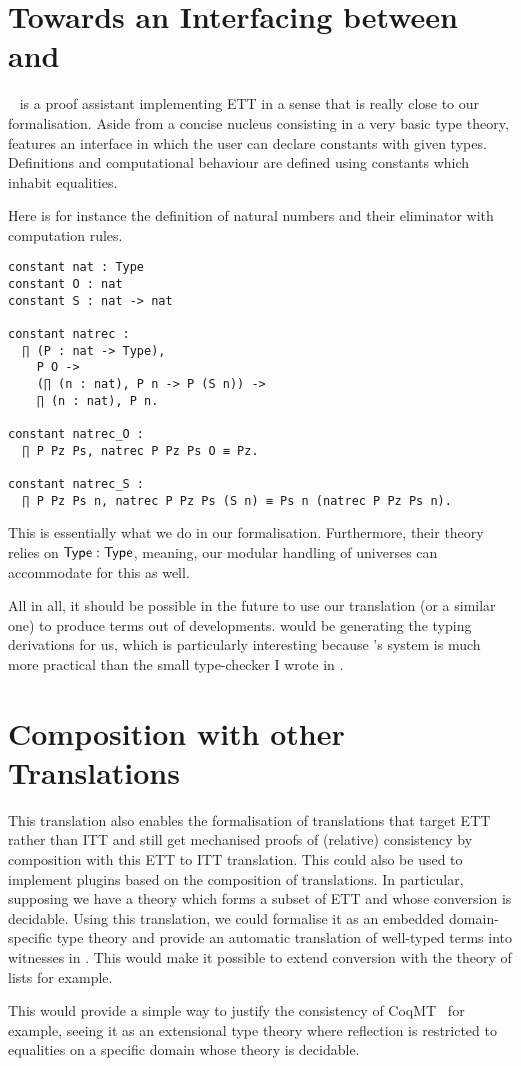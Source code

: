\section{Towards an Interfacing between \Andromeda and \Coq}

\Andromeda~ is a proof assistant implementing \acrshort{ETT}
in a sense that is really close to our formalisation. Aside from a concise
nucleus consisting in a very basic type theory, \Andromeda features an interface
in which the user can declare constants with given types. Definitions and
computational behaviour are defined using constants which inhabit equalities.

Here is for instance the definition of natural numbers and their eliminator
with computation rules.
\begin{verbatim}
constant nat : Type
constant O : nat
constant S : nat -> nat

constant natrec :
  ∏ (P : nat -> Type),
    P O ->
    (∏ (n : nat), P n -> P (S n)) ->
    ∏ (n : nat), P n.

constant natrec_O :
  ∏ P Pz Ps, natrec P Pz Ps O ≡ Pz.

constant natrec_S :
  ∏ P Pz Ps n, natrec P Pz Ps (S n) ≡ Ps n (natrec P Pz Ps n).
\end{verbatim}
This is essentially what we do in our formalisation.
Furthermore, their theory relies on $\mathsf{Type} : \mathsf{Type}$, meaning, our modular
handling of universes can accommodate for this as well.

All in all, it should be possible in the future to use our translation
(or a similar one) to produce \Coq terms out of \Andromeda developments.
\Andromeda would be generating the typing derivations for us, which is
particularly interesting because \Andromeda's system is much more practical
than the small type-checker I wrote in \Coq.

\section{Composition with other Translations}

This translation also enables the formalisation of translations that
target \acrshort{ETT} rather than \acrshort{ITT} and still get mechanised proofs
of (relative) consistency by composition with this \acrshort{ETT} to
\acrshort{ITT} translation.
This could also be used to implement plugins based on the composition of
translations. In particular, supposing we have a theory which forms a
subset of \acrshort{ETT} and whose conversion is decidable. Using this
translation, we could formalise it as an embedded domain-specific type theory
and provide an automatic translation of well-typed terms into witnesses in
\Coq. This would make it possible to extend conversion with the theory
of lists for example.

This would provide a simple way to justify the consistency of
\acrshort{CoqMT}~ for example, seeing it
as an extensional type theory where reflection is restricted to equalities on a
specific domain whose theory is decidable.